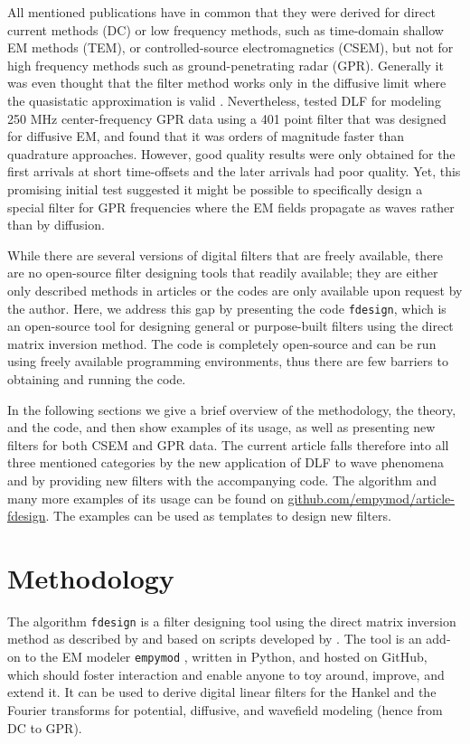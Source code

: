 \documentclass[paper,twocolumn,twoside]{geophysics}
\begin{document}
All mentioned publications have in common that they were derived for direct
current methods (DC) or low frequency methods, such as time-domain shallow EM
methods (TEM), or controlled-source electromagnetics (CSEM), but not for high
frequency methods such as ground-pe\-ne\-tra\-ting radar (GPR). Generally it
was even thought that the filter method works only in the diffusive limit where
the quasistatic approximation is valid \citep[e.g.,][]{GEO.15.Hunziker}.
Nevertheless, \cite{GEO.17.Werthmuller} tested DLF for modeling 250 MHz
center-frequency GPR data using a 401 point filter that was designed for
diffusive EM, and found that it was orders of magnitude faster than quadrature
approaches. However, good quality results were only obtained for the first
arrivals at short time-offsets and the later arrivals had poor quality. Yet,
this promising initial test suggested it might be possible to specifically
design a special filter for GPR frequencies where the EM fields propagate as
waves rather than by diffusion.

While there are several versions of digital filters that are freely available,
there are no open-source filter designing tools that readily available; they
are either only described methods in articles or the codes are only available
upon request by the author. Here, we address this gap by presenting the code
\texttt{fdesign}, which is an open-source tool for designing general or
purpose-built filters using the direct matrix inversion method. The code is
completely open-source and can be run using freely available programming
environments, thus there are few barriers to obtaining and running the code.

In the following sections we give a brief overview of the methodology, the
theory, and the code, and then show examples of its usage, as well as
presenting new filters for both CSEM and GPR data. The current article falls
therefore into all three mentioned categories by the new application of DLF to
wave phenomena and by providing new filters with the accompanying code. The
algorithm and many more examples of its usage can be found on
\href{https://github.com/empymod/article-fdesign}{github.com/empymod/article-fdesign}.
The examples can be used as templates to design new filters.


\section{Methodology}

The algorithm \texttt{fdesign} is a filter designing tool using the direct
matrix inversion method as described by \cite{GP.07.Kong} and based on scripts
developed by \cite{GEO.12.Key}. The tool is an add-on to the EM modeler
\texttt{empymod} \citep{GEO.17.Werthmuller}, written in Python, and hosted on
GitHub, which should foster interaction and enable anyone to toy around,
improve, and extend it. It can be used to derive digital linear filters for the
Hankel and the Fourier transforms for potential, diffusive, and wavefield
modeling (hence from DC to GPR).
\end{document}
